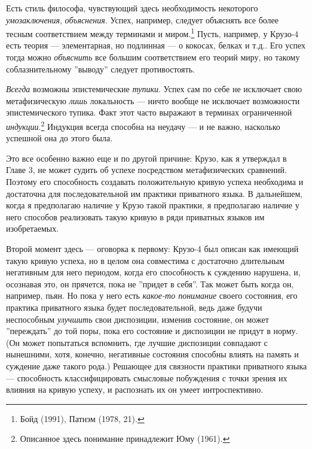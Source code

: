 \documentclass[11pt]{book}
\begin{document}
Есть стиль философа, чувствующий здесь необходимость некоторого \textit{умозаключения}, \textit{объяснения}. Успех, например, следует объяснять все более тесным соответствием между терминами и миром.\footnote{Бойд (1991), Патнэм (1978, 21).} Пусть, например, у Крузо-4 есть теория --- элементарная, но подлинная --- о кокосах, белках и т.д.. Его успех тогда можно \textit{объяснить} все большим соответствием его теорий миру, но такому соблазнительному ''выводу'' следует противостоять.

\textit{Всегда} возможны эпистемические \textit{тупики}. Успех сам по себе не исключает свою метафизическую \textit{лишь} локальность --- ничто вообще не исключает возможности эпистемического тупика. Факт этот часто выражают в терминах ограниченной \textit{индукции}.\footnote{Описанное здесь понимание принадлежит Юму (1961).} Индукция всегда способна на неудачу --- и не важно, насколько успешной она до этого была.

Это все особенно важно еще и по другой причине: Крузо, как я утверждал в Главе 3, не может судить об успехе посредством метафизических сравнений. Поэтому его способность создавать положительную кривую успеха необходима и достаточна для последовательной им практики приватного языка. В дальнейшем, когда я предполагаю наличие у Крузо такой практики, я предполагаю наличие у него способов реализовать такую кривую в ряди приватных языков им изобретаемых.

Второй момент здесь --- оговорка к первому: Крузо-4 был описан как имеющий такую кривую успеха, но в целом она совместима с достаточно длительным негативным для него периодом, когда его способность к суждению нарушена, и, осознавая это, он прячется, пока не ''придет в себя''. Так может быть когда он, например, пьян. Но пока у него есть \textit{какое-то понимание} своего состояния, его практика приватного языка будет последовательной, ведь даже будучи неспособным \textit{улучшить} свои диспозиции, изменив состояние, он может ''переждать'' до той поры, пока его состояние и диспозиции не придут в норму. (Он может попытаться вспомнить, где лучшие диспозиции совпадают с нынешними, хотя, конечно, негативные состояния способны влиять на память и суждение даже такого рода.) Решающее для связности практики приватного языка --- способность классифицировать смысловые побуждения с точки зрения их влияния на кривую успеху, и распознать их он умеет интроспективно.
\end{document}
